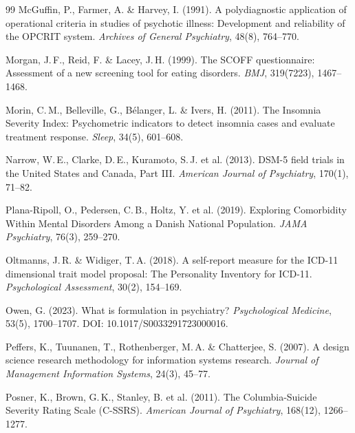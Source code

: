 \documentclass[11pt,a4paper]{article}
\begin{document}
\begin{thebibliography}{99}
McGuffin, P., Farmer, A. \& Harvey, I. (1991).
\newblock A polydiagnostic application of operational criteria in studies of psychotic illness: Development and reliability of the OPCRIT system.
\newblock \textit{Archives of General Psychiatry}, 48(8), 764--770.

Morgan, J.\,F., Reid, F. \& Lacey, J.\,H. (1999).
\newblock The SCOFF questionnaire: Assessment of a new screening tool for eating disorders.
\newblock \textit{BMJ}, 319(7223), 1467--1468.

Morin, C.\,M., Belleville, G., B\'elanger, L. \& Ivers, H. (2011).
\newblock The Insomnia Severity Index: Psychometric indicators to detect insomnia cases and evaluate treatment response.
\newblock \textit{Sleep}, 34(5), 601--608.

Narrow, W.\,E., Clarke, D.\,E., Kuramoto, S.\,J. et al. (2013).
\newblock DSM-5 field trials in the United States and Canada, Part III.
\newblock \textit{American Journal of Psychiatry}, 170(1), 71--82.

Plana-Ripoll, O., Pedersen, C.\,B., Holtz, Y. et al. (2019).
\newblock Exploring Comorbidity Within Mental Disorders Among a Danish National Population.
\newblock \textit{JAMA Psychiatry}, 76(3), 259--270.

Oltmanns, J.\,R. \& Widiger, T.\,A. (2018).
\newblock A self-report measure for the ICD-11 dimensional trait model proposal: The Personality Inventory for ICD-11.
\newblock \textit{Psychological Assessment}, 30(2), 154--169.

Owen, G. (2023).
\newblock What is formulation in psychiatry?
\newblock \textit{Psychological Medicine}, 53(5), 1700--1707. DOI: 10.1017/S0033291723000016.

Peffers, K., Tuunanen, T., Rothenberger, M.\,A. \& Chatterjee, S. (2007).
\newblock A design science research methodology for information systems research.
\newblock \textit{Journal of Management Information Systems}, 24(3), 45--77.

Posner, K., Brown, G.\,K., Stanley, B. et al. (2011).
\newblock The Columbia-Suicide Severity Rating Scale (C-SSRS).
\newblock \textit{American Journal of Psychiatry}, 168(12), 1266--1277.


\end{thebibliography}
\end{document}

